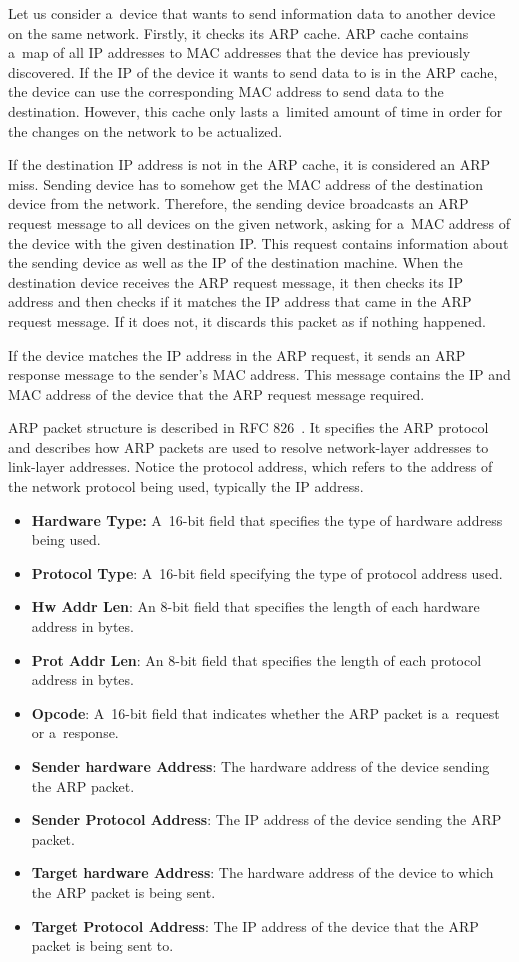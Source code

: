 \documentclass[
  printed,     %
  color,       %
  oneside,     %
  nosansbold,  %
  nocolorbold, %
  nolof,         %
  nolot,         %
]{fithesis4}
\begin{document}
Let us consider a~device that wants to send information data to another device on the same network. Firstly, it checks its ARP cache. ARP cache contains a~map of all IP addresses to MAC addresses that the device has previously discovered. If the IP of the device it wants to send data to is in the ARP cache, the device can use the corresponding MAC address to send data to the destination. However, this cache only lasts a~limited amount of time in order for the changes on the network to be actualized.

If the destination IP address is not in the ARP cache, it is considered an ARP miss. Sending device has to somehow get the MAC address of the destination device from the network. Therefore, the sending device broadcasts an ARP request message to all devices on the given network, asking for a~MAC address of the device with the given destination IP. This request contains information about the sending device as well as the IP of the destination machine. When the destination device receives the ARP request message, it then checks its IP address and then checks if it matches the IP address that came in the ARP request message. If it does not, it discards this packet as if nothing happened.

If the device matches the IP address in the ARP request, it sends an ARP response message to the sender's MAC address. This message contains the IP and MAC address of the device that the ARP request message required.

ARP packet structure is described in RFC 826~\cite{RFC0826}. It specifies the ARP protocol and describes how ARP packets are used to resolve network-layer addresses to link-layer addresses. Notice the protocol address, which refers to the address of the network protocol being used, typically the IP address.

\begin{itemize}[noitemsep,topsep=0pt]
    \item \textbf{Hardware Type:} A~16-bit field that specifies the type of hardware address being used.
    \item \textbf{Protocol Type}: A~16-bit field specifying the type of protocol address used.
    \item \textbf{Hw Addr Len}: An 8-bit field that specifies the length of each hardware address in bytes.
    \item \textbf{Prot Addr Len}: An 8-bit field that specifies the length of each protocol address in bytes.
    \item \textbf{Opcode}: A~16-bit field that indicates whether the ARP packet is a~request or a~response.
    \item \textbf{Sender hardware Address}: The hardware address of the device sending the ARP packet.
    \item \textbf{Sender Protocol Address}: The IP address of the device sending the ARP packet.
    \item \textbf{Target hardware Address}: The hardware address of the device to which the ARP packet is being sent.
    \item \textbf{Target Protocol Address}: The IP address of the device that the ARP packet is being sent to.
\end{itemize}
\end{document}
